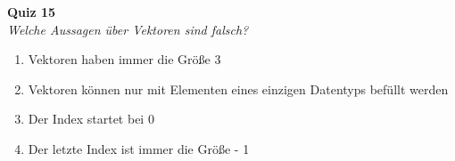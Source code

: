 \textbf{Quiz 15}\\
\textit{Welche Aussagen über Vektoren sind falsch?}
\begin{enumerate}[label=\alph*)]
    \item Vektoren haben immer die Größe 3
    \item Vektoren können nur mit Elementen eines einzigen Datentyps befüllt werden
    \item Der Index startet bei 0
    \item Der letzte Index ist immer die Größe - 1
\end{enumerate}
